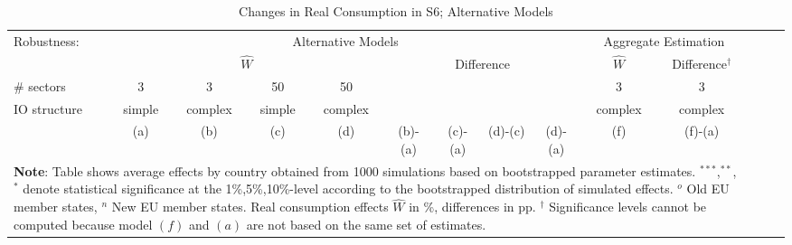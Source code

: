 \documentclass[a4paper,12pt]{article}
\begin{document}
\begin{appendix}
\renewcommand{\tabcolsep}{.1cm}

\begin{table}[h!]
\caption{Changes in Real Consumption in S6; Alternative Models}
\centering
{\scriptsize
\begin{tabular}{lccccccccccccc}
\toprule						
Robustness: & \multicolumn{8}{c}{Alternative Models}  &\multicolumn{2}{c}{Aggregate Estimation} \\
\cmidrule(rl){2-9}\cmidrule(rl){10-11}
& \multicolumn{4}{c}{$\hat W$} &\multicolumn{4}{c}{Difference}   & $\hat W$ & Difference$^\dagger$\\
\cmidrule(rl){2-5}\cmidrule(rl){6-9}\cmidrule(rl){10-10}\cmidrule(rl){11-11}
\# sectors & 3 & 3 & 50 & 50 & &  &&  & 3 & 3\\
IO structure & simple & complex & simple & complex & &  & & & complex & complex\\
& (a) & (b) & (c) & (d) & (b)-(a) &(c)-(a) &(d)-(c) &(d)-(a)  & (f) & (f)-(a)\\
\midrule

\bottomrule
\multicolumn{11}{l}{\parbox[t]{6in}{\scriptsize{\textbf{Note}: Table shows average effects by country obtained from 1000 simulations based on bootstrapped parameter estimates.  $^{***}$,$^{**}$,$^{*}$ denote statistical significance at the 1\%,5\%,10\%-level according to the bootstrapped distribution of simulated effects. $^o$ Old EU member states, $^n$ New EU member states. Real consumption effects $\hat W$ in \%, differences in pp. $^\dagger$ Significance levels cannot be computed because model $(f)$ and $(a)$ are not based on the same set of estimates.}}}
\end {tabular}}
\label{table_rob_models}

\end{table}



\end{appendix}
\end{document}
